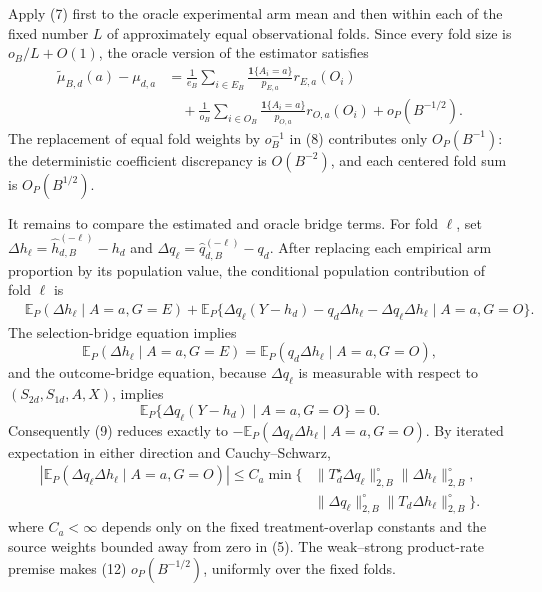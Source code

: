 Apply (7) first to the oracle experimental arm mean and then within each of the fixed number \(L\) of approximately equal observational folds.  Since every fold size is \(o_B/L+O(1)\), the oracle version of the estimator satisfies
\[
\begin{aligned}
 \widetilde\mu_{B,d}(a)-\mu_{d,a}
 &=\frac1{e_B}\sum_{i\in E_B}
   \frac{\mathbf 1\{A_i=a\}}{p_{E,a}}r_{E,a}(O_i)\\
 &\quad+\frac1{o_B}\sum_{i\in O_B}
   \frac{\mathbf 1\{A_i=a\}}{p_{O,a}}r_{O,a}(O_i)
 +o_P(B^{-1/2}).
\end{aligned}                                                \tag{8}
\]
The replacement of equal fold weights by \(o_B^{-1}\) in (8) contributes only \(O_P(B^{-1})\): the deterministic coefficient discrepancy is \(O(B^{-2})\), and each centered fold sum is \(O_P(B^{1/2})\).

It remains to compare the estimated and oracle bridge terms.  For fold \(\ell\), set
\(\Delta h_\ell=\widehat h_{d,B}^{(-\ell)}-h_d\) and
\(\Delta q_\ell=\widehat q_{d,B}^{(-\ell)}-q_d\).  After replacing each empirical arm proportion by its population value, the conditional population contribution of fold \(\ell\) is
\[
\begin{aligned}
 &\mathbb E_P(\Delta h_\ell\mid A=a,G=E)
 +\mathbb E_P\{\Delta q_\ell(Y-h_d)-q_d\Delta h_\ell
                -\Delta q_\ell\Delta h_\ell\mid A=a,G=O\}.
\end{aligned}                                                \tag{9}
\]
The selection-bridge equation implies
\[
 \mathbb E_P(\Delta h_\ell\mid A=a,G=E)
 =\mathbb E_P(q_d\Delta h_\ell\mid A=a,G=O),                \tag{10}
\]
and the outcome-bridge equation, because \(\Delta q_\ell\) is measurable with respect to \((S_{2d},S_{1d},A,X)\), implies
\[
 \mathbb E_P\{\Delta q_\ell(Y-h_d)\mid A=a,G=O\}=0.        \tag{11}
\]
Consequently (9) reduces exactly to
\(-\mathbb E_P(\Delta q_\ell\Delta h_\ell\mid A=a,G=O)\).
By iterated expectation in either direction and Cauchy--Schwarz,
\[
\begin{aligned}
 |\mathbb E_P(\Delta q_\ell\Delta h_\ell\mid A=a,G=O)|
 \le C_a\min\{&
 \|T_d^\star\Delta q_\ell\|_{2,B}^{\circ}
 \|\Delta h_\ell\|_{2,B}^{\circ},\\
 &\|\Delta q_\ell\|_{2,B}^{\circ}
 \|T_d\Delta h_\ell\|_{2,B}^{\circ}\}.
\end{aligned}                                                \tag{12}
\]
where \(C_a<\infty\) depends only on the fixed treatment-overlap constants and the source weights bounded away from zero in (5).  The weak--strong product-rate premise makes (12) \(o_P(B^{-1/2})\), uniformly over the fixed folds.

